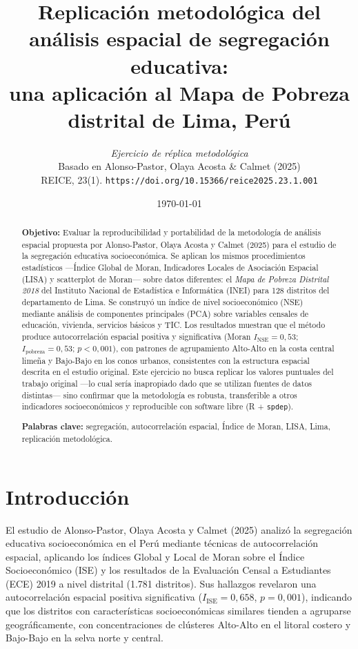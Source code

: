 \documentclass[12pt,a4paper]{article}
\title{\textbf{Replicación metodológica del análisis espacial de segregación educativa:\\
una aplicación al Mapa de Pobreza distrital de Lima, Perú}}
\author{
  \small \textit{Ejercicio de réplica metodológica} \\[4pt]
  \normalsize Basado en Alonso-Pastor, Olaya Acosta \& Calmet (2025) \\
  \small REICE, 23(1). \texttt{https://doi.org/10.15366/reice2025.23.1.001}
}
\date{\today}
\begin{document}
\maketitle

\begin{abstract}
\noindent
\textbf{Objetivo:} Evaluar la reproducibilidad y portabilidad de la metodología de análisis espacial propuesta por Alonso-Pastor, Olaya Acosta y Calmet (2025) para el estudio de la segregación educativa socioeconómica. Se aplican los mismos procedimientos estadísticos —Índice Global de Moran, Indicadores Locales de Asociación Espacial (LISA) y scatterplot de Moran— sobre datos diferentes: el \textit{Mapa de Pobreza Distrital 2018} del Instituto Nacional de Estadística e Informática (INEI) para 128 distritos del departamento de Lima. Se construyó un índice de nivel socioeconómico (NSE) mediante análisis de componentes principales (PCA) sobre variables censales de educación, vivienda, servicios básicos y TIC. Los resultados muestran que el método produce autocorrelación espacial positiva y significativa (Moran $I_{\text{NSE}} = 0{,}53$; $I_{\text{pobreza}} = 0{,}53$; $p < 0{,}001$), con patrones de agrupamiento Alto-Alto en la costa central limeña y Bajo-Bajo en los conos urbanos, consistentes con la estructura espacial descrita en el estudio original. Este ejercicio no busca replicar los valores puntuales del trabajo original —lo cual sería inapropiado dado que se utilizan fuentes de datos distintas— sino confirmar que la metodología es robusta, transferible a otros indicadores socioeconómicos y reproducible con software libre (R + \texttt{spdep}).

\smallskip
\noindent
\textbf{Palabras clave:} segregación, autocorrelación espacial, Índice de Moran, LISA, Lima, replicación metodológica.
\end{abstract}

\section{Introducción}

El estudio de Alonso-Pastor, Olaya Acosta y Calmet (2025) analizó la segregación educativa socioeconómica en el Perú mediante técnicas de autocorrelación espacial, aplicando los índices Global y Local de Moran sobre el Índice Socioeconómico (ISE) y los resultados de la Evaluación Censal a Estudiantes (ECE) 2019 a nivel distrital (1.781 distritos). Sus hallazgos revelaron una autocorrelación espacial positiva significativa ($I_{\text{ISE}} = 0{,}658$, $p = 0{,}001$), indicando que los distritos con características socioeconómicas similares tienden a agruparse geográficamente, con concentraciones de clústeres Alto-Alto en el litoral costero y Bajo-Bajo en la selva norte y central.
\end{document}
